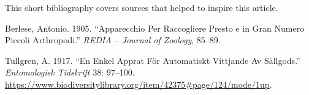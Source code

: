 \documentclass[
]{article}
\newlength{\cslhangindent}
\newlength{\cslentryspacingunit} %
\newenvironment{CSLReferences}[2] %
 {%
  \setlength{\parindent}{0pt}
  \ifodd #1
  \let\oldpar\par
  \def\par{\hangindent=\cslhangindent\oldpar}
  \fi
  \setlength{\parskip}{#2\cslentryspacingunit}
 }%
 {}
\begin{document}
This short bibliography covers sources that helped to inspire this article.

\hypertarget{refs}{}
\begin{CSLReferences}{1}{0}
\leavevmode{}%
Berlese, Antonio. 1905. {``Apparecchio Per Raccogliere Presto e in Gran Numero Piccoli Arthropodi.''} \emph{REDIA -- Journal of Zoology}, 85--89.

\leavevmode{}%
Tullgren, A. 1917. {``En Enkel Apprat För Automatiskt Vittjande Av Sällgods.''} \emph{Entomologisk Tidskrift} 38: 97--100. \url{https://www.biodiversitylibrary.org/item/42375\#page/124/mode/1up}.

\end{CSLReferences}

\let\cleardoublepage\clearpage
\end{document}
